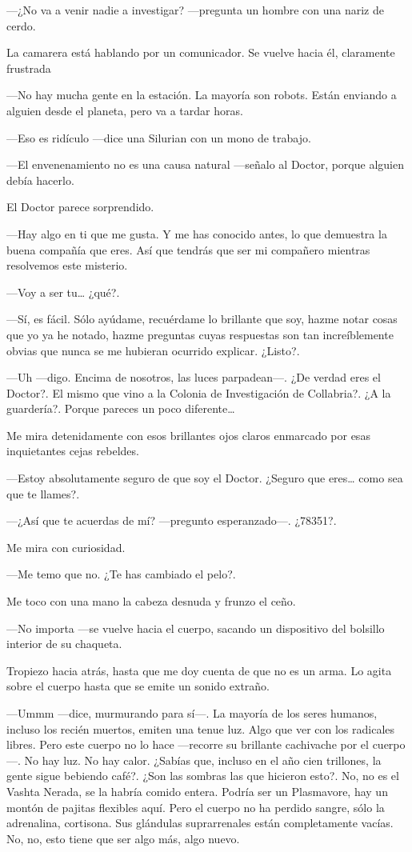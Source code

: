 ---¿No va a venir nadie a investigar? ---pregunta un hombre con una
nariz de cerdo.

La camarera está hablando por un comunicador. Se vuelve hacia él,
claramente frustrada

---No hay mucha gente en la estación. La mayoría son robots. Están
enviando a alguien desde el planeta, pero va a tardar horas.

---Eso es ridículo ---dice una Silurian con un mono de trabajo.

---El envenenamiento no es una causa natural ---señalo al Doctor, porque
alguien debía hacerlo.

El Doctor parece sorprendido. 

---Hay algo en ti que me gusta. Y me has conocido antes, lo que
demuestra la buena compañía que eres. Así que tendrás que ser mi
compañero mientras resolvemos este misterio.

---Voy a ser tu\ldots{} ¿qué?.

---Sí, es fácil. Sólo ayúdame, recuérdame lo brillante que soy, hazme
notar cosas que yo ya he notado, hazme preguntas cuyas respuestas son
tan increíblemente obvias que nunca se me hubieran ocurrido
explicar. ¿Listo?.

---Uh ---digo. Encima de nosotros, las luces parpadean---. ¿De verdad
eres el Doctor?. El mismo que vino a la Colonia de Investigación de
Collabria?. ¿A la guardería?. Porque pareces un poco diferente\ldots{}

Me mira detenidamente con esos brillantes ojos claros enmarcado por esas
inquietantes cejas rebeldes. 

---Estoy absolutamente seguro de que soy el Doctor. ¿Seguro que
eres\ldots{} como sea que te llames?.

---¿Así que te acuerdas de mí? ---pregunto esperanzado---. ¿78351?.

Me mira con curiosidad. 

---Me temo que no. ¿Te has cambiado el pelo?.

Me toco con una mano la cabeza desnuda y frunzo el ceño.

---No importa ---se vuelve hacia el cuerpo, sacando un dispositivo del
bolsillo interior de su chaqueta.

Tropiezo hacia atrás, hasta que me doy cuenta de que no es un arma. Lo
agita sobre el cuerpo hasta que se emite un sonido extraño.

---Ummm ---dice, murmurando para sí---. La mayoría de los seres humanos,
incluso los recién muertos, emiten una tenue luz. Algo que ver con los
radicales libres. Pero este cuerpo no lo hace ---recorre su brillante
cachivache por el cuerpo---. No hay luz. No hay calor. ¿Sabías que,
incluso en el año cien trillones, la gente sigue bebiendo café?. ¿Son
las sombras las que hicieron esto?. No, no es el Vashta Nerada, se la
habría comido entera. Podría ser un Plasmavore, hay un montón de pajitas
flexibles aquí. Pero el cuerpo no ha perdido sangre, sólo la adrenalina,
cortisona. Sus glándulas suprarrenales están completamente vacías. No,
no, esto tiene que ser algo más, algo nuevo.

